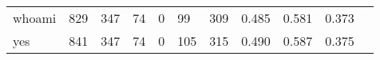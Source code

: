 \begin{longtable}{lp{1.10cm}p{1.10cm}p{1.10cm}p{1.10cm}p{1.10cm}p{1.10cm}p{1.10cm}p{1.10cm}p{1.10cm}p{1.10cm}}
whoami    &                    829 &                                347 &                                74 &                                0 &                                99 &                             309 &                             0.485 &                                 0.581 &                               0.373 \\
yes       &                    841 &                                347 &                                74 &                                0 &                               105 &                             315 &                             0.490 &                                 0.587 &                               0.375 \\
\end{longtable}
